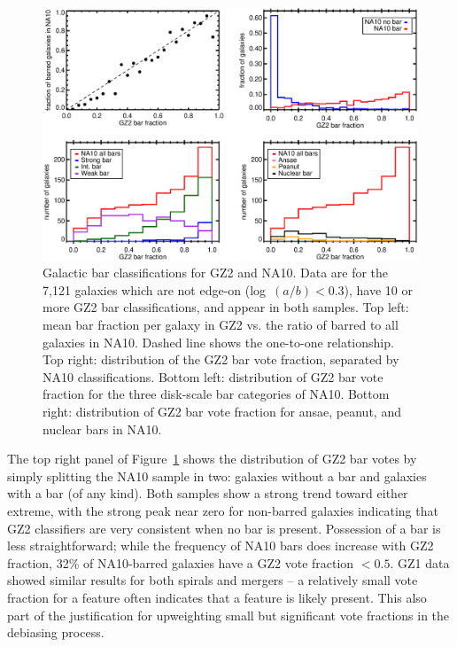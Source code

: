 \documentclass[useAMS,usenatbib]{mn2e}
\begin{document}
\begin{figure}
\includegraphics[angle=0,width=7.0in]{figures/na_bars_axial_10.eps}
\caption{Galactic bar classifications for GZ2 and NA10. Data are for the 7,121 galaxies which are not edge-on (log~$(a/b)<0.3$), have 10 or more GZ2 bar classifications, and appear in both samples. Top left: mean bar fraction per galaxy in GZ2 vs. the ratio of barred to all galaxies in NA10. Dashed line shows the one-to-one relationship. Top right: distribution of the GZ2 bar vote fraction, separated by NA10 classifications. Bottom left: distribution of GZ2 bar vote fraction for the three disk-scale bar categories of NA10. Bottom right: distribution of GZ2 bar vote fraction for ansae, peanut, and nuclear bars in NA10. 
\label{fig-na_bars}}
\end{figure}

The top right panel of Figure~\ref{fig-na_bars} shows the distribution of GZ2 bar votes by simply splitting the NA10 sample in two: galaxies without a bar and galaxies with a bar (of any kind). Both samples show a strong trend toward either extreme, with the strong peak near zero for non-barred galaxies indicating that GZ2 classifiers are very consistent when no bar is present. Possession of a bar is less straightforward; while the frequency of NA10 bars does increase with GZ2 fraction, 32\% of NA10-barred galaxies have a GZ2 vote fraction $<0.5$. GZ1 data showed similar results for both spirals \citep{bam09} and mergers \citep{dar10a} -- a relatively small vote fraction for a feature often indicates that a feature is likely present. This also part of the justification for upweighting small but significant vote fractions in the debiasing process.  
\end{document}
